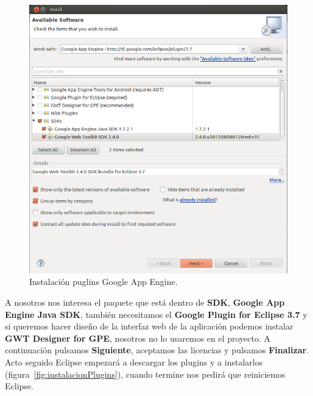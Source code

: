 \begin{figure}[hbt]
  \centering
    \includegraphics[scale=0.6]{./ConfiguracionEclipse/imagenes/instalacionGAE.png}
  \caption{Instalación puglins Google App Engine.}
  \label{fig:instalacionGAE}
\end{figure}

A nosotros nos interesa el paquete que está dentro de \textbf{SDK}, \textbf{Google App Engine Java SDK}, también necesitamos el \textbf{Google Plugin for Eclipse 3.7} y si queremos hacer diseño de la interfaz web de la aplicación podemos instalar \textbf{GWT Designer for GPE}, nosotros no lo usaremos en el proyecto. A continuación pulsamos \textbf{Siguiente}, aceptamos las licencias y pulsamos \textbf{Finalizar}. Acto seguido Eclipse empezará a descargar los plugins y a instalarlos (figura~\ref{fig:instalacionPlugins}), cuando termine nos pedirá que reiniciemos Eclipse.

